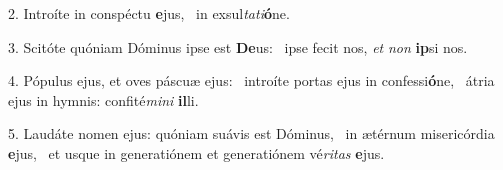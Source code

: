 2. Introíte in conspéctu \textbf{e}jus, \ast\  in exsul\textit{ta}\textit{ti}\textbf{ó}ne.\

3. Scitóte quóniam Dóminus ipse est \textbf{De}us: \ast\  ipse fecit nos, \textit{et} \textit{non} \textbf{ip}si nos.\

4. Pópulus ejus, et oves páscuæ ejus: \dag\  introíte portas ejus in confessi\textbf{ó}ne, \ast\  átria ejus in hymnis: confité\textit{mi}\textit{ni} \textbf{il}li.\

5. Laudáte nomen ejus: quóniam suávis est Dóminus, \dag\  in ætérnum misericórdia \textbf{e}jus, \ast\  et usque in generatiónem et generatiónem vé\textit{ri}\textit{tas} \textbf{e}jus.\

